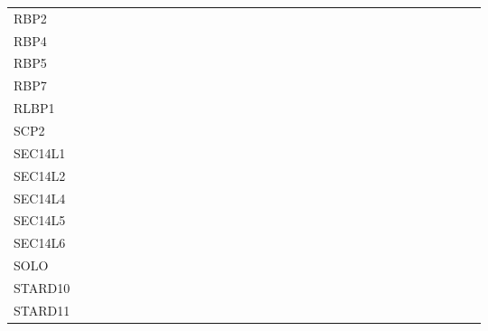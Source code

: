 \begin{tabular}{lllllllllllllllllllllllllllllllll}
RBP2 &  &  &  &  &  &  &  &  &  &  &  &  &  &  &  &  &  &  &  &  &  &  &  &  &  &  &  &  &  & \cellcolor{emblgreen!75} &  & \\
RBP4 &  &  &  &  &  &  &  &  &  &  &  &  &  &  &  &  &  &  &  &  &  &  &  &  &  &  &  &  &  & \cellcolor{emblgreen!75} &  & \\
RBP5 &  &  &  &  &  &  &  &  &  &  &  &  &  &  &  &  &  &  &  &  &  &  &  &  &  &  &  &  &  & \cellcolor{emblgreen!75} &  & \\
RBP7 &  &  &  &  &  &  &  &  &  &  &  &  &  &  &  &  &  &  &  &  &  &  &  &  &  &  &  &  &  & \cellcolor{emblgreen!75} &  & \\
RLBP1 &  &  &  &  &  &  &  &  &  &  &  &  &  &  &  &  &  &  &  &  &  &  &  &  &  &  &  &  &  & \cellcolor{emblgreen!75} &  & \\
SCP2 &  &  & \cellcolor{emblgreen!75} &  &  &  &  &  & \cellcolor{emblgreen!75} &  &  &  & \cellcolor{emblgreen!75} &  &  &  &  &  & \cellcolor{emblgreen!75} & \cellcolor{emblgreen!75} &  &  &  & \cellcolor{emblgreen!75} &  &  &  &  &  &  &  & \cellcolor{emblgreen!75}\\
SEC14L1 &  &  &  &  &  &  &  &  &  &  &  &  &  &  &  &  &  &  &  &  &  &  &  &  &  &  &  &  &  &  &  & \\
SEC14L2 &  &  &  &  &  &  &  &  &  &  &  &  &  &  &  & \cellcolor{emblgreen!75} &  &  & \cellcolor{emblgreen!75} &  &  & \cellcolor{emblgreen!75} &  & \cellcolor{emblgreen!75} & \cellcolor{emblgreen!75} &  & \cellcolor{emblgreen!75} &  &  &  & \cellcolor{emblgreen!75} & \\
SEC14L4 &  &  &  &  &  &  &  &  &  &  &  &  &  &  &  &  &  &  & \cellcolor{emblgreen!75} &  &  & \cellcolor{emblgreen!75} &  & \cellcolor{emblgreen!75} &  &  & \cellcolor{emblgreen!75} &  &  &  & \cellcolor{emblgreen!75} & \\
SEC14L5 &  &  &  &  &  &  &  &  &  &  &  &  &  &  &  &  &  &  &  &  &  &  &  &  &  &  &  &  &  &  &  & \\
SEC14L6 &  &  &  &  &  &  &  &  &  &  &  &  &  &  &  &  &  &  &  &  &  &  &  &  &  &  &  &  &  &  &  & \\
SOLO &  &  &  &  &  &  &  &  &  &  &  &  &  &  &  &  &  &  &  &  &  &  &  &  &  &  &  &  &  &  &  & \\
STARD10 &  &  &  &  &  &  &  &  &  &  &  &  &  &  &  &  &  &  & \cellcolor{emblgreen!75} &  & \cellcolor{emblgreen!75} &  &  &  &  &  &  &  &  &  &  & \\
STARD11 &  &  &  &  & \cellcolor{emblgreen!75} &  &  &  &  &  &  &  &  &  &  &  &  &  &  &  &  &  &  &  &  &  &  &  &  &  &  & \\

\end{tabular}
